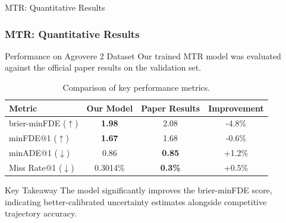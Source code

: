 \documentclass[10pt,aspectratio=169]{beamer}
\begin{document}
\begin{frame}{MTR: Quantitative Results}
    \frametitle{MTR: Quantitative Results}
    \begin{block}{Performance on Agrovere 2 Dataset}
        Our trained MTR model was evaluated against the official paper results on the validation set.
    \end{block}
    \begin{table}
        \centering
        \renewcommand{\arraystretch}{1.3}
        \begin{tabular}{|l|c|c|c|}
            \hline
            \textbf{Metric} & \textbf{Our Model} & \textbf{Paper Results} & \textbf{Improvement} \\
            \hline
            brier-minFDE ($\uparrow$) & \textbf{1.98} & 2.08 & \textcolor{mygreen}{-4.8\%} \\
            minFDE@1 ($\uparrow$) & \textbf{1.67} & 1.68 & \textcolor{mygreen}{-0.6\%} \\
            minADE@1 ($\downarrow$) & 0.86 & \textbf{0.85} & \textcolor{myred}{+1.2\%} \\
            Miss Rate@1 ($\downarrow$) & 0.3014\% & \textbf{0.3\%} & \textcolor{myred}{+0.5\%} \\
            \hline
        \end{tabular}
        \caption{Comparison of key performance metrics.}
    \end{table}
    \begin{alertblock}{Key Takeaway}
        The model significantly improves the brier-minFDE score, indicating better-calibrated uncertainty estimates alongside competitive trajectory accuracy.
    \end{alertblock}
\end{frame}
\end{document}
